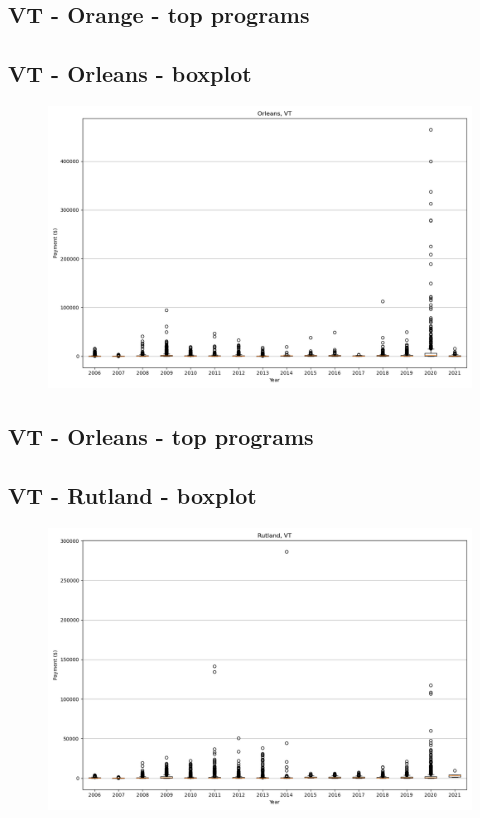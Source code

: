 \subsection*{VT - Orange - top programs}

\newpage
\subsection*{VT - Orleans - boxplot}
\begin{figure}[h]
\centering
\includegraphics[width=7in]{../output/boxplots/counties/Orleans-VT_boxplot.png}
\end{figure}


\subsection*{VT - Orleans - top programs}

\newpage
\subsection*{VT - Rutland - boxplot}
\begin{figure}[h]
\centering
\includegraphics[width=7in]{../output/boxplots/counties/Rutland-VT_boxplot.png}
\end{figure}


